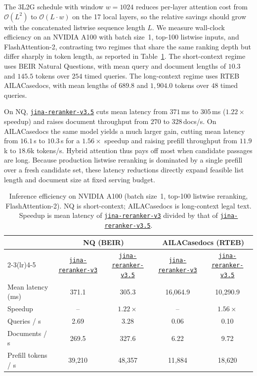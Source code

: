 \documentclass{article}
\newcommand{\jrrvthree}{\href{https://huggingface.co/jinaai/jina-reranker-v3}{\texttt{jina-reranker-v3}}}
\newcommand{\jrrvthreefive}{\href{https://huggingface.co/jinaai/jina-reranker-v3.5}{\texttt{jina-reranker-v3.5}}}
\begin{document}
The 3L2G schedule with window $w{=}1024$ reduces per-layer attention cost from $\mathcal{O}(L^2)$ to $\mathcal{O}(L\cdot w)$ on the 17 local layers, so the relative savings should grow with the concatenated listwise sequence length $L$.
We measure wall-clock efficiency on an NVIDIA A100 with batch size~1, top-100 listwise inputs, and FlashAttention-2, contrasting two regimes that share the same ranking depth but differ sharply in token length, as reported in Table~\ref{tab:efficiency}. The short-context regime uses BEIR Natural Questions, with mean query and document lengths of $10.3$ and $145.5$ tokens over $254$ timed queries. The long-context regime uses RTEB AILACasedocs, with mean lengths of $689.8$ and $1{,}904.0$ tokens over $48$ timed queries.

On NQ, \jrrvthreefive{} cuts mean latency from $371$\,ms to $305$\,ms ($1.22\times$ speedup) and raises document throughput from $270$ to $328$\,docs/s.
On AILACasedocs the same model yields a much larger gain, cutting mean latency from $16.1$\,s to $10.3$\,s for a $1.56\times$ speedup and raising prefill throughput from $11.9$k to $18.6$k tokens/s. Hybrid attention thus pays off most when candidate passages are long.
Because production listwise reranking is dominated by a single prefill over a fresh candidate set, these latency reductions directly expand feasible list length and document size at fixed serving budget.

\begin{table}[t]
\centering
\small
\renewcommand{\arraystretch}{1.25}
\caption{Inference efficiency on NVIDIA A100 (batch size~1, top-100 listwise reranking, FlashAttention-2).
NQ is short-context; AILACasedocs is long-context legal text.
Speedup is mean latency of \jrrvthree{} divided by that of \jrrvthreefive{}.}
\label{tab:efficiency}
\setlength{\tabcolsep}{4pt}
\begin{tabular}{@{}l cc cc@{}}
\toprule
 & \multicolumn{2}{c}{NQ (BEIR)} & \multicolumn{2}{c}{AILACasedocs (RTEB)} \\
\cmidrule(lr){2-3}\cmidrule(lr){4-5}
 & \jrrvthree & \jrrvthreefive & \jrrvthree & \jrrvthreefive \\
\midrule
Mean latency (ms) & 371.1 & 305.3 & 16{,}064.9 & 10{,}290.9 \\
Speedup & -- & $1.22\times$ & -- & $1.56\times$ \\
Queries / s & 2.69 & 3.28 & 0.06 & 0.10 \\
Documents / s & 269.5 & 327.6 & 6.22 & 9.72 \\
Prefill tokens / s & 39{,}210 & 48{,}357 & 11{,}884 & 18{,}620 \\
\bottomrule
\end{tabular}
\end{table}
\end{document}
